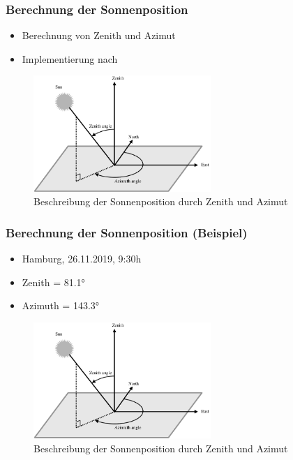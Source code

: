 \documentclass{beamer}
\begin{document}
\begin{frame}
  \frametitle{Berechnung der Sonnenposition}
  \begin{itemize}
  \item Berechnung von Zenith und Azimut
  \item Implementierung nach \citet[]{Roderick1992}
  \end{itemize}
  \begin{figure}[hbtp]
    \centering
    \includegraphics[width=0.6\textwidth]{./img/Representation-of-azimuth-and-zenith-angles.png}
    \caption{Beschreibung der Sonnenposition durch Zenith und
      Azimut~\cite[]{Nou2016}}\label{fig:zen_azi}
  \end{figure}
\end{frame}
\begin{frame}
  \frametitle{Berechnung der Sonnenposition (Beispiel)}
  \begin{itemize}
  \item Hamburg, 26.11.2019, 9:30h
  \item Zenith = 81.1°
  \item Azimuth = 143.3°
  \end{itemize}
  \begin{figure}[hbtp]
    \centering
    \includegraphics[width=0.6\textwidth]{./img/Representation-of-azimuth-and-zenith-angles.png}
    \caption{Beschreibung der Sonnenposition durch Zenith und
      Azimut~\cite[]{Nou2016}}\label{fig:zen_azi}
  \end{figure}
\end{frame}
\end{document}
